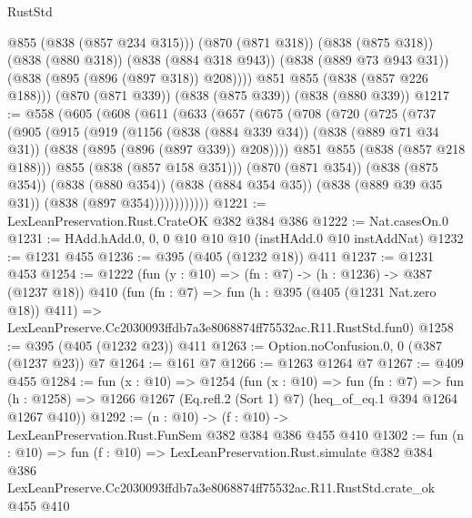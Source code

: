 \begin{lexlean}{RustStd}
\begin{coremodule}
            @855
            (@838 (@857 @234 @315)))
          (@870 (@871 @318))
          (@838 (@875 @318))
          (@838 (@880 @318))
          (@838 (@884 @318 @943))
          (@838 (@889 @73 @943 @31))
          (@838 (@895 (@896 (@897 @318)) @208))))
      @851
      @855
      (@838 (@857 @226 @188)))
    (@870 (@871 @339))
    (@838 (@875 @339))
    (@838 (@880 @339))
@1217 := @558
    (@605
      (@608
        (@611
          (@633
            (@657
              (@675
                (@708
                  (@720
                    (@725
                      (@737
                        (@905
                          (@915
                            (@919
                              (@1156
                                (@838 (@884 @339 @34))
                                (@838 (@889 @71 @34 @31))
                                (@838 (@895 (@896 (@897 @339)) @208))))
                            @851
                            @855
                            (@838 (@857 @218 @188)))
                          @855
                          (@838 (@857 @158 @351)))
                        (@870 (@871 @354))
                        (@838 (@875 @354))
                        (@838 (@880 @354))
                        (@838 (@884 @354 @35))
                        (@838 (@889 @39 @35 @31))
                        (@838 (@897 @354))))))))))))
@1221 := LexLeanPreservation.Rust.CrateOK @382 @384 @386
@1222 := Nat.casesOn.{0}
@1231 := HAdd.hAdd.{0, 0, 0} @10 @10 @10 (instHAdd.{0} @10 instAddNat)
@1232 := @1231 @455
@1236 := @395 (@405 (@1232 @18)) @411
@1237 := @1231 @453
@1254 := @1222
    (fun (y : @10) => (fn : @7) -> (h : @1236) -> @387 (@1237 @18))
    @410
    (fun (fn : @7) =>
    fun (h : @395 (@405 (@1231 Nat.zero @18)) @411) =>
    LexLeanPreserve.Cc2030093ffdb7a3e8068874ff75532ac.R11.RustStd.fun0)
@1258 := @395 (@405 (@1232 @23)) @411
@1263 := Option.noConfusion.{0, 0} (@387 (@1237 @23)) @7
@1264 := @161 @7
@1266 := @1263 @1264 @7
@1267 := @409 @455
@1284 := fun (x : @10) =>
  @1254
    (fun (x : @10) =>
    fun (fn : @7) =>
    fun (h : @1258) => @1266 @1267 (Eq.refl.{2} (Sort 1) @7) (heq_of_eq.{1} @394 @1264 @1267 @410))
@1292 := (n : @10) -> (f : @10) -> LexLeanPreservation.Rust.FunSem @382 @384 @386 @455 @410
@1302 := fun (n : @10) =>
  fun (f : @10) =>
  LexLeanPreservation.Rust.simulate
    @382
    @384
    @386
    LexLeanPreserve.Cc2030093ffdb7a3e8068874ff75532ac.R11.RustStd.crate_ok
    @455
    @410
\end{coremodule}
\end{lexlean}
